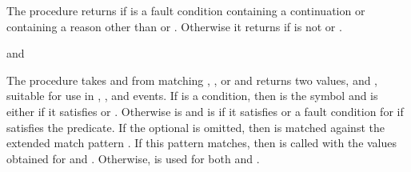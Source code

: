 The  procedure returns  if  is
a fault condition containing a continuation or containing a reason other
than  or .
Otherwise it returns  if  is
not  or .

\begin{procedure}
\end{procedure}
\returns{}  and 

The  procedure takes  and 
from matching
,
, or
and returns two values,  and , suitable
for use in , ,
and  events.
If  is a condition, then  is the symbol 
and  is either  if it satisfies 
or .
Otherwise  is  and  is  if it
satisfies  or a fault condition for 
if  satisfies the  predicate.
If the optional  is omitted, then  is matched against the
extended match pattern .
If this pattern matches, then  is called with the
values obtained for  and .
Otherwise,  is used for both  and .
